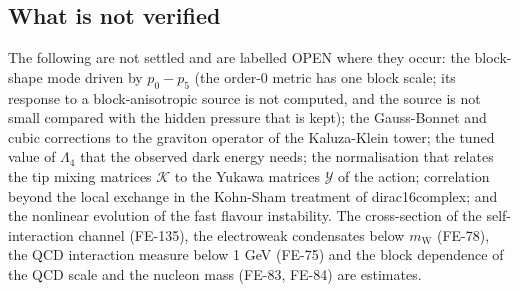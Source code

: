 \documentclass[
  10pt,
]{article}
\begin{document}
\hypertarget{what-is-not-verified}{%
\subsection{What is not verified}\label{what-is-not-verified}}

The following are not settled and are labelled OPEN where they occur:
the block-shape mode driven by \(p_0 - p_5\) (the order-0 metric has one
block scale; its response to a block-anisotropic source is not computed,
and the source is not small compared with the hidden pressure that is
kept); the Gauss-Bonnet and cubic corrections to the graviton operator
of the Kaluza-Klein tower; the tuned value of \(\Lambda_4\) that the
observed dark energy needs; the normalisation that relates the tip
mixing matrices \(\mathcal{K}\) to the Yukawa matrices \(\mathcal{Y}\)
of the action; correlation beyond the local exchange in the Kohn-Sham
treatment of dirac16complex; and the nonlinear evolution of the fast
flavour instability. The cross-section of the self-interaction channel
(FE-135), the electroweak condensates below \(m_{\mathrm{W}}\) (FE-78),
the QCD interaction measure below 1 GeV (FE-75) and the block dependence
of the QCD scale and the nucleon mass (FE-83, FE-84) are estimates.
\end{document}
